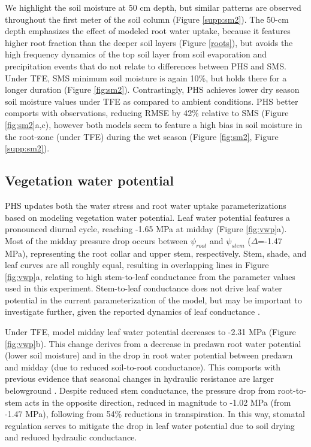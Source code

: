 \documentclass[draft,linenumbers]{agujournal}
\begin{document}
We highlight the soil moisture at 50 cm depth, but similar patterns are observed throughout the first meter of the soil column (Figure \ref{supp:sm2}).
The 50-cm depth emphasizes the effect of modeled root water uptake, because it features higher root fraction than the deeper soil layers (Figure \ref{roots}), 
but avoids the high frequency dynamics of the top soil layer from soil evaporation and precipitation events that do not relate to differences between PHS and SMS.
Under TFE, SMS minimum soil moisture is again 10\%, but holds there for a longer duration (Figure \ref{fig:sm2}).
Contrastingly, PHS achieves lower dry season soil moisture values under TFE as compared to ambient conditions.
PHS better comports with observations, reducing RMSE by 42\% relative to SMS (Figure \ref{fig:sm2}a,c),
however both models seem to feature a high bias in soil moisture in the root-zone (under TFE) during the wet season (Figure \ref{fig:sm2}, Figure \ref{supp:sm2}).

\subsection{Vegetation water potential}

PHS updates both the water stress and root water uptake parameterizations based on modeling vegetation water potential.
Leaf water potential features a pronounced diurnal cycle, reaching -1.65 MPa at midday (Figure \ref{fig:vwp}a).
Most of the midday pressure drop occurs between $\psi_{root}$ and $\psi_{stem}$ ($\Delta$=-1.47 MPa), representing the root collar and upper stem, respectively.
Stem, shade, and leaf curves are all roughly equal, resulting in overlapping lines in Figure \ref{fig:vwp}a, relating to high stem-to-leaf conductance from the parameter values used in this experiment.
Stem-to-leaf conductance does not drive leaf water potential in the current parameterization of the model, but may be important to investigate further, given the reported dynamics of leaf conductance \citep{simonin2015}. 
    
    Under TFE, model midday leaf water potential decreases to -2.31 MPa (Figure \ref{fig:vwp}b). 
    This change derives from a decrease in predawn root water potential (lower soil moisture) and in the drop in root water potential between predawn and midday (due to reduced soil-to-root conductance).
    This comports with previous evidence that seasonal changes in hydraulic resistance are larger belowground \citep{fisher2006}.
    Despite reduced stem conductance, the pressure drop from root-to-stem acts in the opposite direction, reduced in magnitude to -1.02 MPa (from -1.47 MPa), following from 54\% reductions in transpiration.
    In this way, stomatal regulation serves to mitigate the drop in leaf water potential due to soil drying and reduced hydraulic conductance. 
\end{document}
